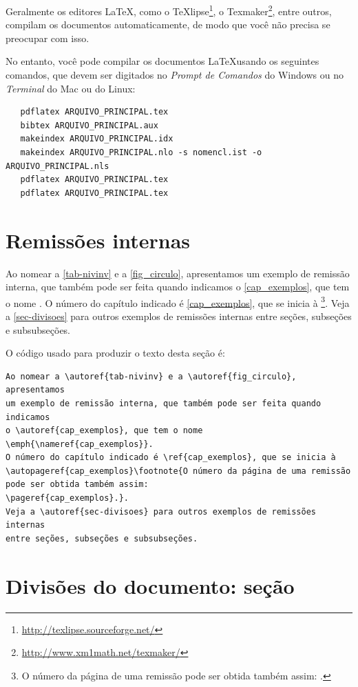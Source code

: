 Geralmente os editores \LaTeX, como o
TeXlipse\footnote{\url{http://texlipse.sourceforge.net/}}, o
Texmaker\footnote{\url{http://www.xm1math.net/texmaker/}}, entre outros,
compilam os documentos automaticamente, de modo que você não precisa se
preocupar com isso.

No entanto, você pode compilar os documentos \LaTeX usando os seguintes
comandos, que devem ser digitados no \emph{Prompt de Comandos} do Windows ou no
\emph{Terminal} do Mac ou do Linux:

\begin{verbatim}
   pdflatex ARQUIVO_PRINCIPAL.tex
   bibtex ARQUIVO_PRINCIPAL.aux
   makeindex ARQUIVO_PRINCIPAL.idx 
   makeindex ARQUIVO_PRINCIPAL.nlo -s nomencl.ist -o ARQUIVO_PRINCIPAL.nls
   pdflatex ARQUIVO_PRINCIPAL.tex
   pdflatex ARQUIVO_PRINCIPAL.tex
\end{verbatim}

\section{Remissões internas}

Ao nomear a \autoref{tab-nivinv} e a \autoref{fig_circulo}, apresentamos um
exemplo de remissão interna, que também pode ser feita quando indicamos o
\autoref{cap_exemplos}, que tem o nome \emph{}. O número
do capítulo indicado é \ref{cap_exemplos}, que se inicia à
\footnote{O número da página de uma remissão pode ser
obtida também assim:
\pageref{cap_exemplos}.}.
Veja a \autoref{sec-divisoes} para outros exemplos de remissões internas entre
seções, subseções e subsubseções.

O código usado para produzir o texto desta seção é:

\begin{verbatim}
Ao nomear a \autoref{tab-nivinv} e a \autoref{fig_circulo}, apresentamos
um exemplo de remissão interna, que também pode ser feita quando indicamos
o \autoref{cap_exemplos}, que tem o nome \emph{\nameref{cap_exemplos}}.
O número do capítulo indicado é \ref{cap_exemplos}, que se inicia à 
\autopageref{cap_exemplos}\footnote{O número da página de uma remissão
pode ser obtida também assim:
\pageref{cap_exemplos}.}.
Veja a \autoref{sec-divisoes} para outros exemplos de remissões internas
entre seções, subseções e subsubseções.
\end{verbatim}

\section{Divisões do documento: seção}\label{sec-divisoes}

